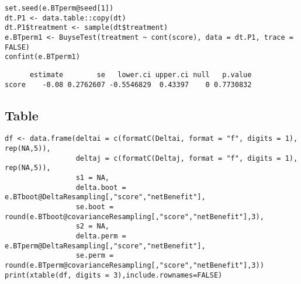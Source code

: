 \documentclass[12pt]{article}
\begin{document}
\lstset{language=r,label= ,caption= ,captionpos=b,numbers=none}
\begin{lstlisting}
set.seed(e.BTperm@seed[1])
dt.P1 <- data.table::copy(dt)
dt.P1$treatment <- sample(dt$treatment)
e.BTperm1 <- BuyseTest(treatment ~ cont(score), data = dt.P1, trace = FALSE)
confint(e.BTperm1)

\end{lstlisting}

\begin{verbatim}
      estimate        se   lower.ci upper.ci null   p.value
score    -0.08 0.2762607 -0.5546829  0.43397    0 0.7730832
\end{verbatim}

\subsection{Table}
\label{sec:orgd8d844c}

\lstset{language=r,label= ,caption= ,captionpos=b,numbers=none}
\begin{lstlisting}
df <- data.frame(deltai = c(formatC(Deltai, format = "f", digits = 1), rep(NA,5)),
                 deltaj = c(formatC(Deltaj, format = "f", digits = 1), rep(NA,5)),
                 s1 = NA,
                 delta.boot = e.BTboot@DeltaResampling[,"score","netBenefit"],
                 se.boot = round(e.BTboot@covarianceResampling[,"score","netBenefit"],3),
                 s2 = NA,
                 delta.perm = e.BTperm@DeltaResampling[,"score","netBenefit"],
                 se.perm = round(e.BTperm@covarianceResampling[,"score","netBenefit"],3))
print(xtable(df, digits = 3),include.rownames=FALSE)
\end{lstlisting}
\end{document}
